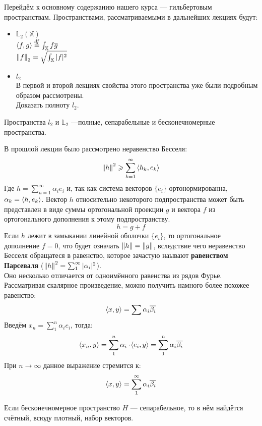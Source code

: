 \documentclass[12pt]{article}
\begin{document}
	Перейдём к основному содержанию нашего курса --- гильбертовым пространствам. Пространствами, рассматриваемыми 
	в дальнейших лекциях будут:
	\begin{itemize}
		\item $\mathbb{L}_2(\mathbb{X})$ \\
		$\left\langle f, g \right\rangle \overset{df}{=} \int_{\mathbb{X}} f\overline{g}$ \\
		$\left\| f \right\|_2 = \sqrt{\int_{\mathbb{X}} |f|^2}$ \\
		
		\item $l_2$ \\
		В первой и второй лекциях свойства этого пространства уже были подробным образом рассмотрены. \\
		\exc Доказать полноту $l_2$.
	\end{itemize}
	Пространства $l_2$ и $\mathbb{L}_2$ ---полные, сепарабельные и бесконечномерные пространства.
	
	В прошлой лекции было рассмотрено неравенство Бесселя: \\
	$$\left\| h \right\|^2 \geqslant \sum_{k=1}^{\infty}\left\langle h_k, e_k \right\rangle$$
	Где $h = \sum_{n=1}^{\infty} \alpha_i e_i$ и, так как система векторов $\{ e_i \}$ ортонормированна, 
	$\alpha_k = \left\langle h, e_k \right\rangle$. Вектор $h$ относительно некоторого подпространства может быть представлен в виде суммы
	ортогональной проекции $g$ и вектора $f$ из ортогонального дополнения к этому подпространству. 
	$$h = g + f$$
	Если $h$ лежит в замыкании линейной оболочки $\{ e_i \}$, то ортогональное дополнение $f = 0$, что будет означать 
	$\left\| h \right\| = \left\| g \right\|$, вследствие чего неравенство Бесселя обращатеся в равенство, которое зачастую наывают 
	\textbf{равенством Парсеваля} ($\left\| h \right\|^2 = \sum_1^{\infty} |\alpha_i|^2$).\\
	Оно несколько отличается от одноимённого равенства из рядов Фурье. Рассматривая скалярное произведение, можно получить
	намного более похожее равенство:
	$$ \left\langle x, y \right\rangle = \sum \alpha_i \overline{\beta_i} $$
	Введём $x_n = \sum_1^n \alpha_i e_i$, тогда:
	$$ \left\langle x_n, y \right\rangle = \sum_1^n \alpha_i \cdot \! \left\langle e_i, y \right\rangle = \sum_1^n \alpha_i \overline{\beta_i}$$
	При $n \rightarrow \infty$ данное выражение стремится к:
	$$ \left\langle x, y \right\rangle = \sum_1^{\infty} \alpha_i \overline{\beta_i} $$
	
	Если бесконечномерное пространство $H$ --- сепарабельное, то в нём найдётся счётный, всюду плотный, набор векторов.
	
\end{document}
